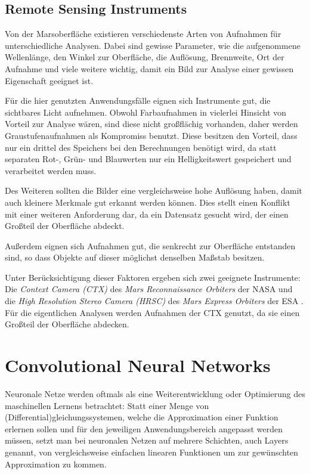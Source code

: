 \subsection{Remote Sensing Instruments} %
\label{ssec:mars_images}

Von der Marsoberfläche existieren verschiedenste Arten von Aufnahmen für unterschiedliche Analysen. Dabei sind gewisse Parameter, wie \zB die aufgenommene Wellenlänge, den Winkel zur Oberfläche, die Auflösung, Brennweite, Ort der Aufnahme und viele weitere wichtig, damit ein Bild zur Analyse einer gewissen Eigenschaft geeignet ist.

Für die hier genutzten Anwendungsfälle eignen sich Instrumente gut, die sichtbares Licht aufnehmen. Obwohl Farbaufnahmen in vielerlei Hinsicht von Vorteil zur Analyse wären, sind diese nicht großflächig vorhanden, daher werden Graustufenaufnahmen als Kompromiss benutzt. Diese besitzen den Vorteil, dass nur ein drittel des Speichers bei den Berechnungen benötigt wird, da statt separaten Rot-, Grün- und Blauwerten nur ein Helligkeitswert gespeichert und verarbeitet werden muss.

Des Weiteren sollten die Bilder eine vergleichsweise hohe Auflösung haben, damit auch kleinere Merkmale gut erkannt werden können. Dies stellt einen Konflikt mit einer weiteren Anforderung dar, da ein Datensatz gesucht wird, der einen Großteil der Oberfläche abdeckt.

Außerdem eignen sich Aufnahmen gut, die senkrecht zur Oberfläche entstanden sind, so dass Objekte auf dieser möglichst denselben Maßstab besitzen.

Unter Berücksichtigung dieser Faktoren ergeben sich \ua zwei geeignete Instrumente:
Die \textit{Context Camera (CTX)} des \textit{Mars Reconnaissance Orbiters} der NASA \cite{malin_07} und die \textit{High Resolution Stereo Camera (HRSC)} des \textit{Mars Express Orbiters} der ESA \cite{hrsc}. Für die eigentlichen Analysen werden Aufnahmen der CTX genutzt, da sie einen Großteil der Oberfläche abdecken.%

\section{Convolutional Neural Networks}
\label{sec:cnn}

Neuronale Netze werden oftmals als eine Weiterentwicklung oder Optimierung des maschinellen Lernens betrachtet: Statt einer Menge von (Differential)gleichungssystemen, welche die Approximation einer Funktion erlernen sollen und \ggf für den jeweiligen Anwendungsbereich angepasst werden müssen, setzt man bei neuronalen Netzen auf mehrere Schichten, auch Layers genannt, von vergleichsweise einfachen linearen Funktionen um zur gewünschten Approximation zu kommen. \cite{hardesty_17}

